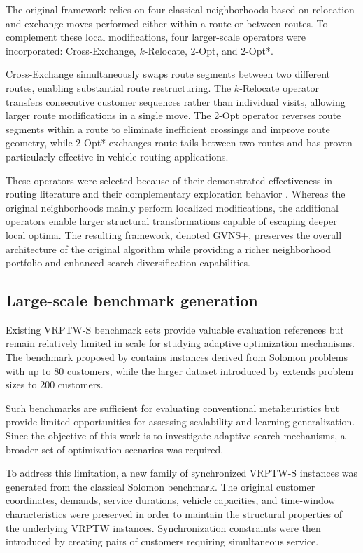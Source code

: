 The original framework relies on four classical neighborhoods based on relocation and exchange moves performed either within a route or between routes. To complement these local modifications, four larger-scale operators were incorporated: Cross-Exchange, $k$-Relocate, 2-Opt, and 2-Opt*.

Cross-Exchange simultaneously swaps route segments between two different routes, enabling substantial route restructuring. The $k$-Relocate operator transfers consecutive customer sequences rather than individual visits, allowing larger route modifications in a single move. The 2-Opt operator reverses route segments within a route to eliminate inefficient crossings and improve route geometry, while 2-Opt* exchanges route tails between two routes and has proven particularly effective in vehicle routing applications.

These operators were selected because of their demonstrated effectiveness in routing literature and their complementary exploration behavior \citep{liu2019adaptive}. Whereas the original neighborhoods mainly perform localized modifications, the additional operators enable larger structural transformations capable of escaping deeper local optima. The resulting framework, denoted GVNS+, preserves the overall architecture of the original algorithm while providing a richer neighborhood portfolio and enhanced search diversification capabilities.

\subsection{Large-scale benchmark generation}
Existing VRPTW-S benchmark sets provide valuable evaluation references but remain relatively limited in scale for studying adaptive optimization mechanisms. The benchmark proposed by \citet{bredstrom2008combined} contains instances derived from Solomon problems with up to 80 customers, while the larger dataset introduced by \citet{liu2019adaptive} extends problem sizes to 200 customers.

Such benchmarks are sufficient for evaluating conventional metaheuristics but provide limited opportunities for assessing scalability and learning generalization. Since the objective of this work is to investigate adaptive search mechanisms, a broader set of optimization scenarios was required.

To address this limitation, a new family of synchronized VRPTW-S instances was generated from the classical Solomon benchmark. The original customer coordinates, demands, service durations, vehicle capacities, and time-window characteristics were preserved in order to maintain the structural properties of the underlying VRPTW instances. Synchronization constraints were then introduced by creating pairs of customers requiring simultaneous service.

